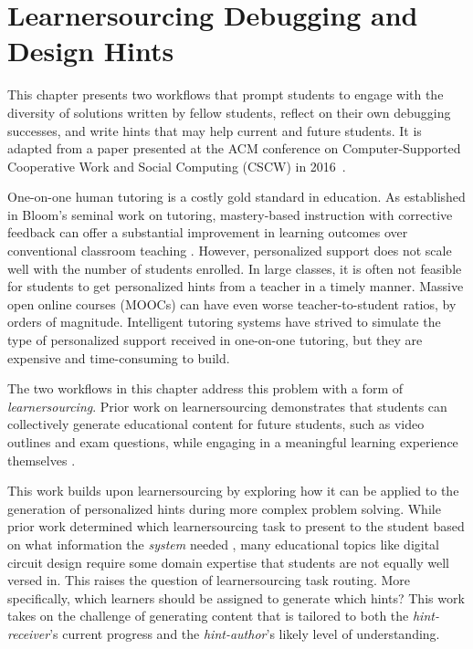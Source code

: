 \chapter{Learnersourcing Debugging and Design Hints}\label{chapter:classoverflow}

This chapter presents two workflows that prompt students to engage with the diversity of solutions written by fellow students, reflect on their own debugging successes, and write hints that may help current and future students. It is adapted from a paper presented at the ACM conference on
Computer-Supported Cooperative Work and
Social Computing (CSCW) in 2016~\cite{classoverflow}.

One-on-one human tutoring is a costly gold standard in education. As established in Bloom's seminal work on tutoring, mastery-based instruction with corrective feedback can offer a substantial improvement in learning outcomes over conventional classroom teaching \cite{bloom}. However, personalized support does not scale well with the number of students enrolled. In large classes, it is often not feasible for students to get personalized hints from a teacher in a timely manner. Massive open online courses (MOOCs) can have even worse teacher-to-student ratios, by orders of magnitude. Intelligent tutoring systems have strived to simulate the type of personalized support received in one-on-one tutoring, but they are expensive and time-consuming to build. 

The two workflows in this chapter address this problem with a form of {\it learnersourcing}. Prior work on learnersourcing demonstrates that students can collectively generate educational content for future students, such as video outlines and exam questions, while engaging in a meaningful learning experience themselves \cite{kim2013learnersourcing,weir2015,mitros2015}. %

This work builds upon learnersourcing by exploring how it can be applied to the generation of personalized hints during more complex problem solving. While prior work determined which learnersourcing task to present to the student based on what information the {\it system} needed \cite{weir2015}, many educational topics like digital circuit design require some domain expertise that students are not equally well versed in. This raises the question of learnersourcing task routing. More specifically, which learners should be assigned to generate which hints? This work takes on the challenge of generating content that is tailored to both the \textit{hint-receiver}'s current progress and the \textit{hint-author}'s likely level of understanding. 

